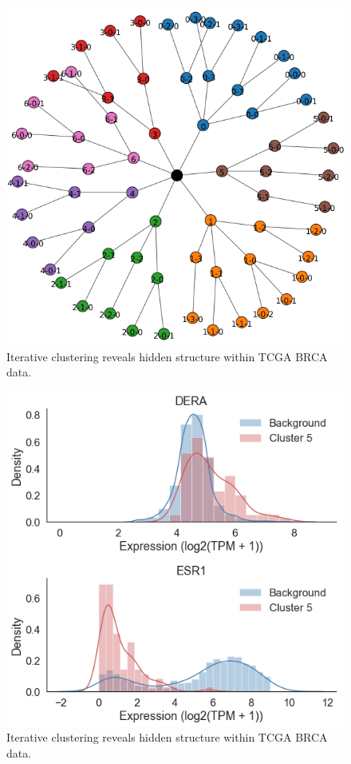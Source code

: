 \documentclass[fleqn,10pt]{wlscirep}
\begin{document}
\begin{figure}
	\centering
	\includegraphics[width=0.8\linewidth]{images/tcga-brca-subcluster-tree.png}
	\caption{Iterative clustering reveals hidden structure within TCGA BRCA data. }
	\label{sfig:brca-ihydra}
\end{figure}

\begin{figure}
	\centering
	\includegraphics[width=0.75\linewidth]{images/example-subtyping-distribution-changes.png}
	\caption{Iterative clustering reveals hidden structure within TCGA BRCA data. }
	\label{sfig:brca-expression-subtypes}
\end{figure}
\end{document}
